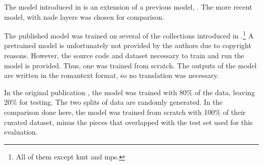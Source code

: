 
The model introduced in \textcite{micchi2021deep} is an
extension of a previous model, \textcite{micchi2020not}. The
more recent model, with \gls{nade} layers was chosen for
comparison.

The published model was trained on several of the
collections introduced in
.\footnote{All of
them except \gls{kmt} and \gls{mps}.} A pretrained model is
unfortunately not provided by the authors due to copyright
reasons. However, the source code and dataset necessary to
train and run the model is provided. Thus, one was trained
from scratch. The outputs of the model are written in the
\gls{romantext} format, so no translation was necessary. 

In the original publication \parencite{micchi2021deep}, the
model was trained with 80\% of the data, leaving 20\% for
testing. The two splits of data are randomly generated. In
the comparison done here, the model was trained from scratch
with 100\% of their curated dataset, minus the pieces that
overlapped with the test set used for this evaluation.
